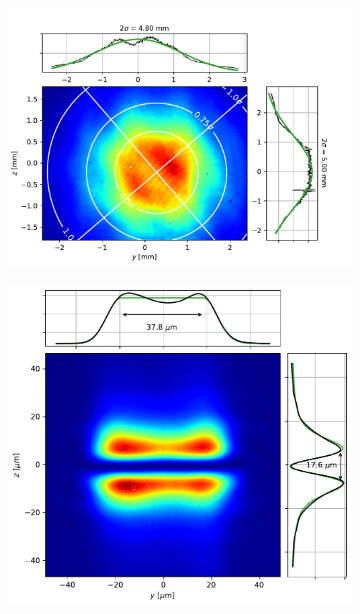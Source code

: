 \begin{figure}
    \begin{subfigure}{0.5\textwidth}
        \centering
        \includegraphics[height=0.75\textwidth]{chapters/chapter_3/figures/x3_sizes/beam1.pdf}
        \caption{}
        \label{fig:f12x3_small_beam}
    \end{subfigure}
    \begin{subfigure}{0.5\textwidth}
        \centering
        \includegraphics[height=0.7\textwidth]{chapters/chapter_3/figures/x3_sizes/tophat1.pdf}
        \caption{}
        \label{fig:f12x3_small_tophat}
    \end{subfigure}
    \begin{subfigure}{0.5\textwidth}
        \centering

\end{subfigure}
\end{figure}
